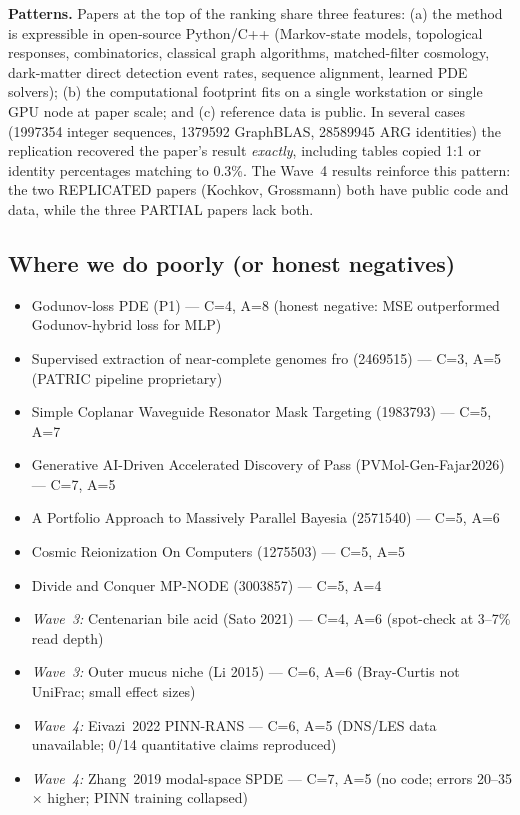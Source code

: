 \noindent\textbf{Patterns.} Papers at the top of the ranking share three
features: (a) the method is expressible in open-source Python/C++
(Markov-state models, topological responses, combinatorics, classical
graph algorithms, matched-filter cosmology, dark-matter direct detection
event rates, sequence alignment, learned PDE solvers); (b) the computational footprint fits on a
single workstation or single GPU node at paper scale; and (c) reference data
is public. In several cases (1997354 integer sequences, 1379592 GraphBLAS,
28589945 ARG identities) the replication recovered the paper's result
\emph{exactly}, including tables copied 1:1 or identity percentages matching
to 0.3\%. The Wave~4 results reinforce this pattern: the two REPLICATED
papers (Kochkov, Grossmann) both have public code and data, while the
three PARTIAL papers lack both.

\subsection{Where we do poorly (or honest negatives)}
\begin{itemize}[leftmargin=1.4em,itemsep=0.2em,topsep=0.2em]
\item Godunov-loss PDE (P1) --- C=4, A=8 (honest negative: MSE outperformed Godunov-hybrid loss for MLP)
\item Supervised extraction of near-complete genomes fro (2469515) --- C=3, A=5 (PATRIC pipeline proprietary)
\item Simple Coplanar Waveguide Resonator Mask Targeting (1983793) --- C=5, A=7
\item Generative AI-Driven Accelerated Discovery of Pass (PVMol-Gen-Fajar2026) --- C=7, A=5
\item A Portfolio Approach to Massively Parallel Bayesia (2571540) --- C=5, A=6
\item Cosmic Reionization On Computers (1275503) --- C=5, A=5
\item Divide and Conquer MP-NODE (3003857) --- C=5, A=4
\item \textit{Wave~3:} Centenarian bile acid (Sato 2021) --- C=4, A=6 (spot-check at 3--7\% read depth)
\item \textit{Wave~3:} Outer mucus niche (Li 2015) --- C=6, A=6 (Bray-Curtis not UniFrac; small effect sizes)
\item \textit{Wave~4:} Eivazi~2022 PINN-RANS --- C=6, A=5 (DNS/LES data unavailable; 0/14 quantitative claims reproduced)
\item \textit{Wave~4:} Zhang~2019 modal-space SPDE --- C=7, A=5 (no code; errors 20--35$\times$ higher; PINN training collapsed)
\end{itemize}

